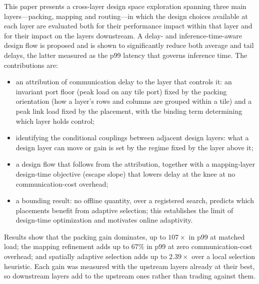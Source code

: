 This paper presents a cross-layer design space exploration spanning three main layers---packing, mapping and routing---in which the design choices available at each layer are evaluated both for their performance impact within that layer and for their impact on the layers downstream. A delay- and inference-time-aware design flow is proposed and is shown to significantly reduce both average and tail delays, the latter measured as the p99 latency that governs inference time. The contributions are:
\begin{itemize}
\item an attribution of communication delay to the layer that controls
      it: an invariant port floor (peak load on any tile
      port) fixed by the packing orientation (how a layer's rows and columns
      are grouped within a tile) and a peak link load fixed by the placement,
      with the binding term determining which layer holds control;
\item identifying the conditional couplings between adjacent design layers: what a design layer
can move or gain is set by the regime fixed by the layer above it;
\item a design flow that follows from the attribution, together with a mapping-layer design-time objective (escape slope) that lowers delay at the knee at no communication-cost overhead;
\item a bounding result: no offline quantity, over a registered search,
      predicts which placements benefit from adaptive selection; this
      establishes the limit of design-time optimization and motivates
      online adaptivity.
\end{itemize}

Results show that the packing gain dominates, up to $107\times$ in p99 at
matched load; the mapping refinement adds up to $67\%$ in p99 at zero
communication-cost overhead; and spatially adaptive selection adds up to
$2.39\times$ over a local selection heuristic. Each gain was measured with
the upstream layers already at their best, so downstream layers add to the
upstream ones rather than trading against them.